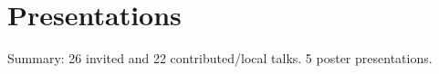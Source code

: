 \documentclass[11pt,a4paper,sans]{moderncv}        %
\begin{document}
%




\section{Presentations}
Summary: 26 invited and 22 contributed/local talks. 5 poster presentations.
\end{document}
